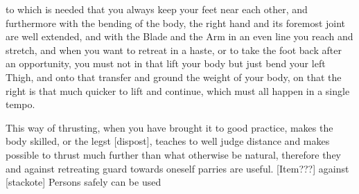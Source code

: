 \newpage


\newpage


to which is needed that you always keep your feet near each other, 
and furthermore with the bending of the body, the right hand and its
foremost joint are well extended, and with the Blade and the Arm in an
even line you reach and stretch, and when you want to retreat in a
haste, or to take the foot back after an opportunity, you must not in
that lift your body but just bend your left Thigh, and onto that
transfer and ground the weight of your body, on that the right is
that much quicker to lift and continue, which must all happen in a
single tempo.


This way of thrusting, when you have brought it to good practice,
makes the body skilled, or the legst [dispost], teaches to well judge distance
and makes possible to thrust much further than what otherwise be
natural, therefore they and against retreating guard towards oneself
parries are useful. [Item???] against [stackote] Persons safely can be
used


